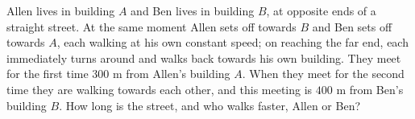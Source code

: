 Allen lives in building $A$ and Ben lives in building $B$, at opposite ends of a straight street. At the same moment Allen sets off towards $B$ and Ben sets off towards $A$, each walking at his own constant speed; on reaching the far end, each immediately turns around and walks back towards his own building. They meet for the first time $300$ m from Allen's building $A$. When they meet for the second time they are walking towards each other, and this meeting is $400$ m from Ben's building $B$. How long is the street, and who walks faster, Allen or Ben?
